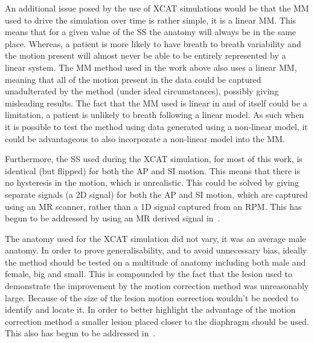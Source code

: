         An additional issue posed by the use of \gls{XCAT} simulations would be that the \gls{MM} used to drive the simulation over time is rather simple, it is a linear \gls{MM}. This means that for a given value of the \gls{SS} the anatomy will always be in the same place. Whereas, a patient is more likely to have breath to breath variability and the motion present will almost never be able to be entirely represented by a linear system. The \gls{MM} method used in the work above also uses a linear \gls{MM}, meaning that all of the motion present in the data could be captured unadulterated by the method (under ideal circumstances), possibly giving misleading results. The fact that the \gls{MM} used is linear in and of itself could be a limitation, a patient is unlikely to breath following a linear model. As such when it is possible to test the method using data generated using a non-linear model, it could be advantageous to also incorporate a non-linear model into the \gls{MM}.
        
        Furthermore, the \gls{SS} used during the \gls{XCAT} simulation, for most of this work, is identical (but flipped) for both the \gls{AP} and \gls{SI} motion. This means that there is no hysteresis in the motion, which is unrealistic. This could be solved by giving separate signals (a \gls{2D} signal) for both the \gls{AP} and \gls{SI} motion, which are captured using an \gls{MR} scanner, rather than a \gls{1D} signal captured from an \gls{RPM}. This has begun to be addressed by using an \gls{MR} derived signal in~.
        
        The anatomy used for the \gls{XCAT} simulation did not vary, it was an average male anatomy. In order to prove generalisability, and to avoid unnecessary bias, ideally the method should be tested on a multitude of anatomy including both male and female, big and small. This is compounded by the fact that the lesion used to demonstrate the improvement by the motion correction method was unreasonably large. Because of the size of the lesion motion correction wouldn't be needed to identify and locate it. In order to better highlight the advantage of the motion correction method a smaller lesion placed closer to the diaphragm should be used. This also has begun to be addressed in~.
        
